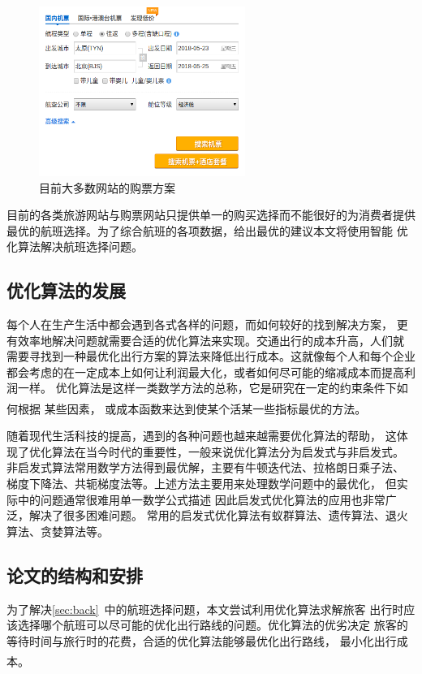 \documentclass[fontset=fandol,a4paper,zihao=5]{ctexart}
\newcommand{\upcite}[1]{\textsuperscript{\textsuperscript{\cite{#1}}}}
\begin{document}
        \begin{figure}[!h]
            \centering
            \includegraphics[width=0.6\textwidth]{pic/flight_website.png}
            \caption{\label{fig:flight_website}目前大多数网站的购票方案}
        \end{figure}

      目前的各类旅游网站与购票网站只提供单一的购买选择而不能很好的为消费者提供
      最优的航班选择。为了综合航班的各项数据，给出最优的建议本文将使用智能
      优化算法解决航班选择问题。
    
		\subsection{优化算法的发展}
			每个人在生产生活中都会遇到各式各样的问题，而如何较好的找到解决方案，
      更有效率地解决问题就需要合适的优化算法来实现。交通出行的成本升高，人们就
      需要寻找到一种最优化出行方案的算法来降低出行成本。这就像每个人和每个企业
      都会考虑的在一定成本上如何让利润最大化，或者如何尽可能的缩减成本而提高利润一样。
      优化算法是这样一类数学方法的总称，它是研究在一定的约束条件下如何根据
      某些因素\upcite{戴书文2005组合优化中启发式算法的研究分析}，
      或成本函数来达到使某个活某一些指标最优的方法。 

			随着现代生活科技的提高，遇到的各种问题也越来越需要优化算法的帮助，
      这体现了优化算法在当今时代的重要性，一般来说优化算法分为启发式与非启发式。
      非启发式算法常用数学方法得到最优解，主要有牛顿迭代法、拉格朗日乘子法、
      梯度下降法、共轭梯度法等。上述方法主要用来处理数学问题中的最优化，
      但实际中的问题通常很难用单一数学公式描述 
      因此启发式优化算法的应用也非常广泛，解决了很多困难问题。
      常用的启发式优化算法有蚁群算法、遗传算法、退火算法、贪婪算法等。
			
		\subsection{论文的结构和安排}
			为了解决\ref{sec:back}\ 中的航班选择问题，本文尝试利用优化算法求解旅客
      出行时应该选择哪个航班可以尽可能的优化出行路线的问题。优化算法的优劣决定
      旅客的等待时间与旅行时的花费，合适的优化算法能够最优化出行路线，
      最小化出行成本\upcite{Segaran2007Programming}。
			
\end{document}
